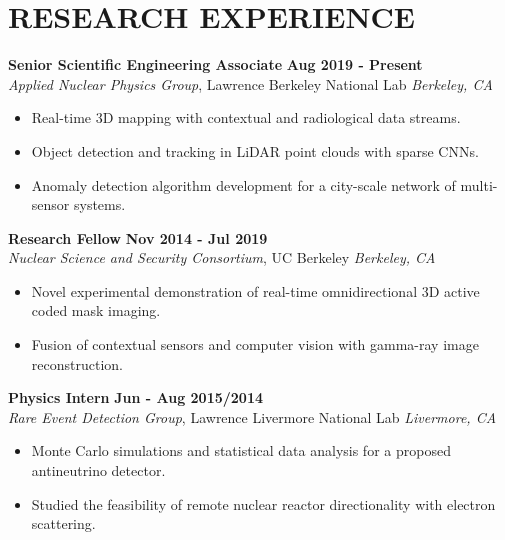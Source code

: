 \section{\small{RESEARCH EXPERIENCE}}

\textbf{Senior Scientific Engineering Associate} \hfill \textbf{Aug 2019 - Present} \\
\textsl{Applied Nuclear Physics Group}, Lawrence Berkeley National Lab \hfill \textsl{Berkeley, CA} \\[-2.8ex]
\vspace{2pt}
\begin{itemize}[leftmargin=4ex] \itemsep -2pt
    \item Real-time 3D mapping with contextual and radiological data streams.
    \item Object detection and tracking in LiDAR point clouds with sparse CNNs.
    \item Anomaly detection algorithm development for a city-scale network of multi-sensor systems.
\end{itemize}
\vspace{-5pt}

\textbf{Research Fellow} \hfill \textbf{Nov 2014 - Jul 2019} \\
\textsl{Nuclear Science and Security Consortium}, UC Berkeley \hfill \textsl{Berkeley, CA} \\[-2.8ex]
\vspace{2pt}
\begin{itemize}[leftmargin=4ex] \itemsep -2pt
	\item Novel experimental demonstration of real-time omnidirectional 3D active coded mask imaging.
    \item Fusion of contextual sensors and computer vision with gamma-ray image reconstruction.
\end{itemize}
\vspace{-5pt}

\textbf{Physics Intern} \hfill \textbf{Jun - Aug 2015/2014} \\
\textsl{Rare Event Detection Group}, Lawrence Livermore National Lab \hfill \textsl{Livermore, CA} \\[-2.8ex]
\vspace{2pt}
\begin{itemize}[leftmargin=4ex] \itemsep -2pt
    \item Monte Carlo simulations and statistical data analysis for a proposed antineutrino detector.
	\item Studied the feasibility of remote nuclear reactor directionality with electron scattering.
\end{itemize}
